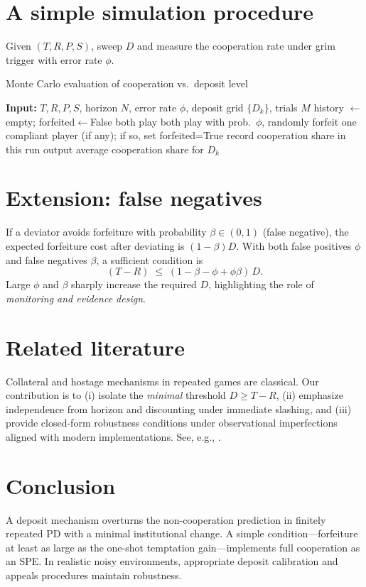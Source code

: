 \documentclass[a4paper,11pt]{article}
\theoremstyle{definition}
\theoremstyle{plain}
\theoremstyle{remark}
\newcommand{\C}{\text{C}} %
\newcommand{\D}{\text{D}} %
\newcommand{\1}{\mathbf{1}}
\begin{document}
\section{A simple simulation procedure}
Given $(T,R,P,S)$, sweep $D$ and measure the cooperation rate under grim trigger with error rate $\phi$.
\begin{algorithm}[H]
\caption{Monte Carlo evaluation of cooperation vs.\ deposit level}
\begin{algorithmic}[1]
\State \textbf{Input:} $T,R,P,S$, horizon $N$, error rate $\phi$, deposit grid $\{D_k\}$, trials $M$
    \State history $\leftarrow$ empty; forfeited$\leftarrow$False
        \State both play \C
       \Else \State both play \D
       \EndIf
       \State with prob.\ $\phi$, randomly forfeit one compliant player (if any); if so, set forfeited=True
    \EndFor
    \State record cooperation share in this run
  \EndFor
  \State output average cooperation share for $D_k$
\EndFor
\end{algorithmic}
\end{algorithm}

\section{Extension: false negatives}
If a deviator avoids forfeiture with probability $\beta\in(0,1)$ (false negative), the expected forfeiture cost after deviating is $(1-\beta)D$.
With both false positives $\phi$ and false negatives $\beta$, a sufficient condition is
\[
(T-R) \;\le\; (1-\beta - \phi + \phi\beta)\,D.
\]
Large $\phi$ and $\beta$ sharply increase the required $D$, highlighting the role of \emph{monitoring and evidence design}.

\section{Related literature}
Collateral and hostage mechanisms in repeated games are classical. Our contribution is to (i) isolate the \emph{minimal} threshold $D\ge T-R$, (ii) emphasize independence from horizon and discounting under immediate slashing, and (iii) provide closed-form robustness conditions under observational imperfections aligned with modern implementations.
See, e.g., \cite{fudenberg_tirole,mailath_samuelson,abreu,kreps}.

\section{Conclusion}
A deposit mechanism overturns the non-cooperation prediction in finitely repeated PD with a minimal institutional change.
A simple condition---forfeiture at least as large as the one-shot temptation gain---implements full cooperation as an SPE.
In realistic noisy environments, appropriate deposit calibration and appeals procedures maintain robustness.
\end{document}
